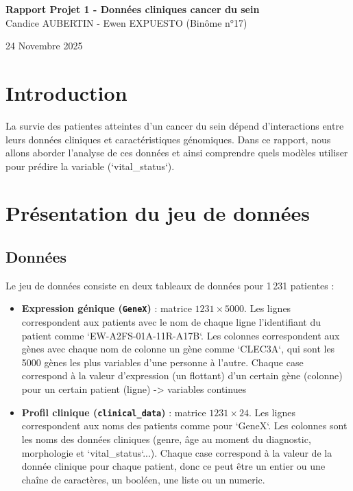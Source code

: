 \documentclass[12pt,a4paper]{report}
\begin{document}
\makeatletter
\def\maketitle{
  \begin{flushleft}
    {\LARGE \textbf{Rapport Projet 1 - Données cliniques cancer du sein}}\\[4pt]
    {\large Candice AUBERTIN - Ewen EXPUESTO (Binôme n°17)}%
  \end{flushleft}
  \begin{flushright}
    \large 24 Novembre 2025
  \end{flushright}
  \vspace{1cm}
}
\makeatother

\maketitle

\vspace{-2cm}

\section{Introduction}
La survie des patientes atteintes d'un cancer du sein dépend d'interactions entre leurs données cliniques et caractéristiques génomiques. Dans ce rapport, nous allons aborder l'analyse de ces données et ainsi comprendre quels modèles utiliser pour prédire la variable (`vital\_status`).

\section{Présentation du jeu de données}
\subsection{Données}
Le jeu de données consiste en deux tableaux de données pour 1\,231 patientes :
\begin{itemize}
  \item \textbf{Expression génique (\texttt{GeneX})} : matrice $1231 \times 5000$. Les lignes correspondent aux patients avec le nom de chaque ligne l'identifiant du patient comme `EW-A2FS-01A-11R-A17B`. Les colonnes correspondent aux gènes avec chaque nom de colonne un gène comme `CLEC3A`, qui sont les 5000 gènes les plus variables d'une personne à l'autre. Chaque case correspond à la valeur d'expression (un flottant) d'un certain gène (colonne) pour un certain patient (ligne) -> variables continues
  \item \textbf{Profil clinique (\texttt{clinical\_data})} : matrice $1231 \times 24$. Les lignes correspondent aux noms des patients comme pour `GeneX`. Les colonnes sont les noms des données cliniques (genre, âge au moment du diagnostic, morphologie et `vital\_status`...). Chaque case correspond à la valeur de la donnée clinique pour chaque patient, donc ce peut être un entier ou une chaîne de caractères, un booléen, une liste ou un numeric.
\end{itemize}
\end{document}
